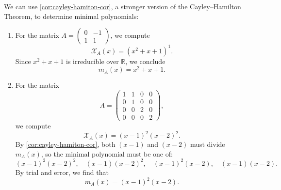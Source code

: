 \begin{example}\label{ex:minpoly-examples}
We can use \autoref{cor:cayley-hamiton-cor}, a stronger version of the Cayley–Hamilton Theorem, to determine minimal polynomials:

\begin{enumerate}
  \item For the matrix \( A = \begin{pmatrix} 0 & -1 \\ 1 & 1 \end{pmatrix} \), we compute
  \[
  \mathcal{X}_A(x) = \left(x^2 + x + 1\right)^1.
  \]
  Since \( x^2 + x + 1 \) is irreducible over \( \mathbb{R} \), we conclude
  \[
  m_A(x) = x^2 + x + 1.
  \]

  \item For the matrix
  \[
  A = \begin{pmatrix}
  1 & 1 & 0 & 0 \\
  0 & 1 & 0 & 0 \\
  0 & 0 & 2 & 0 \\
  0 & 0 & 0 & 2
  \end{pmatrix},
  \]
  we compute
  \[
  \mathcal{X}_A(x) = (x - 1)^2(x - 2)^2.
  \]
  By \autoref{cor:cayley-hamiton-cor}, both \( (x - 1) \) and \( (x - 2) \) must divide \( m_A(x) \), so the minimal polynomial must be one of:
  \[
  (x - 1)^2(x - 2)^2, \quad (x - 1)(x - 2)^2, \quad (x - 1)^2(x - 2), \quad (x - 1)(x - 2).
  \]
  By trial and error, we find that
  \[
  m_A(x) = (x - 1)^2(x - 2).
  \]
\end{enumerate}
\end{example}